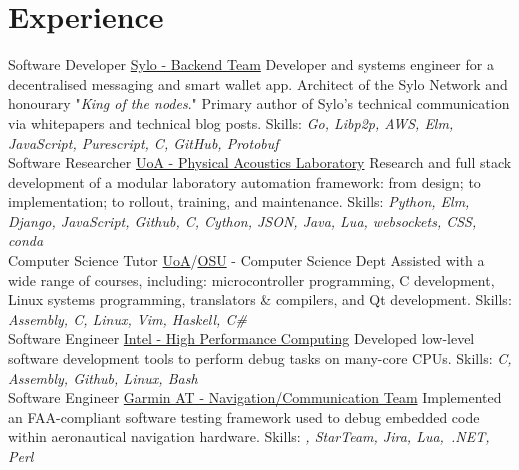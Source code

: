 \documentclass[a4paper]{twentysecondcv}
\begin{document}
\makeprofile{}

\section{Experience}
\begin{twenty}
           {}
           {Software Developer}
           {\href{https://sylo.io/}{Sylo - Backend Team}}
           {}
           {Developer and systems engineer for a decentralised messaging and
           smart wallet app. Architect of the Sylo Network and honourary "\emph{King of the nodes}."
           Primary author of Sylo's technical communication via whitepapers and technical blog posts.
           Skills: \emph{Go, Libp2p, AWS, Elm, JavaScript, Purescript, C, GitHub,
           Protobuf}} \\

           {}
           {Software Researcher}
           {\href{https://pal.auckland.ac.nz/}{UoA - Physical Acoustics Laboratory}}
           {}
           {Research and full stack development of a modular laboratory automation
           framework: from design; to implementation; to rollout, training, and
           maintenance.
           Skills: \emph{Python, Elm, Django, JavaScript, Github, C, Cython, JSON,
           Java, Lua, websockets, CSS, conda}} \\

           {}
           {Computer Science Tutor}
           {\href{http://www.auckland.ac.nz/}{UoA}/\href{http://www.oregonstate.edu/}{OSU} - Computer Science Dept}
           {}
           {Assisted with a wide range of courses, including: microcontroller
           programming, C development, Linux systems programming, translators
           \& compilers, and Qt development.
           Skills: \emph{Assembly, C, Linux, Vim, Haskell, C\#}} \\

           {}
           {Software Engineer}
           {\href{https://www.intel.com}{Intel - High Performance Computing}}
           {}
           {Developed low-level software development tools to perform debug
           tasks on many-core CPUs.
           Skills: \emph{C, Assembly, Github, Linux, Bash}} \\

           {}
           {Software Engineer}
           {\href{http://www.garmin.com}{Garmin AT - Navigation/Communication Team}}
           {}
           {Implemented an FAA-compliant software testing framework used to
           debug embedded code within aeronautical navigation hardware.
           Skills: \emph{\CC, StarTeam, Jira, Lua,~.NET, Perl}} \\


\end{twenty}
\end{document}
